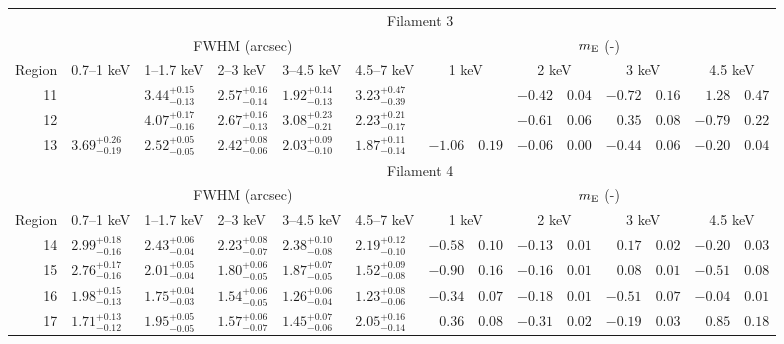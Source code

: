 \begin{tabular}{@{}rlllllr@{ $\pm$ }lr@{ $\pm$ }lr@{ $\pm$ }lr@{ $\pm$ }l@{}}
\midrule
{} & \multicolumn{13}{c}{Filament 3} \\
\cmidrule(l){2-14}
{} & \multicolumn{5}{c}{FWHM (arcsec)} & \multicolumn{8}{c}{$m_\mathrm{E}$ (-)} \\
\cmidrule(lr){2-6} \cmidrule(l){7-14}
Region & 0.7--1 keV & 1--1.7 keV & 2--3 keV & 3--4.5 keV & 4.5--7 keV
       & \multicolumn{2}{c}{1 keV} & \multicolumn{2}{c}{2 keV}
       & \multicolumn{2}{c}{3 keV} & \multicolumn{2}{c}{4.5 keV} \\
\cmidrule{1-14}
11 & {} & ${3.44}^{+0.15}_{-0.13}$ & ${2.57}^{+0.16}_{-0.14}$ & ${1.92}^{+0.14}_{-0.13}$ & ${3.23}^{+0.47}_{-0.39}$
  & \multicolumn{2}{c}{} & $-0.42$ & $0.04$ & $-0.72$ & $0.16$ & $1.28$ & $0.47$ \\
12 & {} & ${4.07}^{+0.17}_{-0.16}$ & ${2.67}^{+0.16}_{-0.13}$ & ${3.08}^{+0.23}_{-0.21}$ & ${2.23}^{+0.21}_{-0.17}$
  & \multicolumn{2}{c}{} & $-0.61$ & $0.06$ & $0.35$ & $0.08$ & $-0.79$ & $0.22$ \\
13 & ${3.69}^{+0.26}_{-0.19}$ & ${2.52}^{+0.05}_{-0.05}$ & ${2.42}^{+0.08}_{-0.06}$ & ${2.03}^{+0.09}_{-0.10}$ & ${1.87}^{+0.11}_{-0.14}$
  & $-1.06$ & $0.19$ & $-0.06$ & $0.00$ & $-0.44$ & $0.06$ & $-0.20$ & $0.04$ \\


\midrule
{} & \multicolumn{13}{c}{Filament 4} \\
\cmidrule(l){2-14}
{} & \multicolumn{5}{c}{FWHM (arcsec)} & \multicolumn{8}{c}{$m_\mathrm{E}$ (-)} \\
\cmidrule(lr){2-6} \cmidrule(l){7-14}
Region & 0.7--1 keV & 1--1.7 keV & 2--3 keV & 3--4.5 keV & 4.5--7 keV
       & \multicolumn{2}{c}{1 keV} & \multicolumn{2}{c}{2 keV}
       & \multicolumn{2}{c}{3 keV} & \multicolumn{2}{c}{4.5 keV} \\
\cmidrule{1-14}
14 & ${2.99}^{+0.18}_{-0.16}$ & ${2.43}^{+0.06}_{-0.04}$ & ${2.23}^{+0.08}_{-0.07}$ & ${2.38}^{+0.10}_{-0.08}$ & ${2.19}^{+0.12}_{-0.10}$
  & $-0.58$ & $0.10$ & $-0.13$ & $0.01$ & $0.17$ & $0.02$ & $-0.20$ & $0.03$ \\
15 & ${2.76}^{+0.17}_{-0.16}$ & ${2.01}^{+0.05}_{-0.04}$ & ${1.80}^{+0.06}_{-0.05}$ & ${1.87}^{+0.07}_{-0.05}$ & ${1.52}^{+0.09}_{-0.08}$
  & $-0.90$ & $0.16$ & $-0.16$ & $0.01$ & $0.08$ & $0.01$ & $-0.51$ & $0.08$ \\
16 & ${1.98}^{+0.15}_{-0.13}$ & ${1.75}^{+0.04}_{-0.03}$ & ${1.54}^{+0.06}_{-0.05}$ & ${1.26}^{+0.06}_{-0.04}$ & ${1.23}^{+0.08}_{-0.06}$
  & $-0.34$ & $0.07$ & $-0.18$ & $0.01$ & $-0.51$ & $0.07$ & $-0.04$ & $0.01$ \\
17 & ${1.71}^{+0.13}_{-0.12}$ & ${1.95}^{+0.05}_{-0.05}$ & ${1.57}^{+0.06}_{-0.07}$ & ${1.45}^{+0.07}_{-0.06}$ & ${2.05}^{+0.16}_{-0.14}$
  & $0.36$ & $0.08$ & $-0.31$ & $0.02$ & $-0.19$ & $0.03$ & $0.85$ & $0.18$ \\


\end{tabular}

